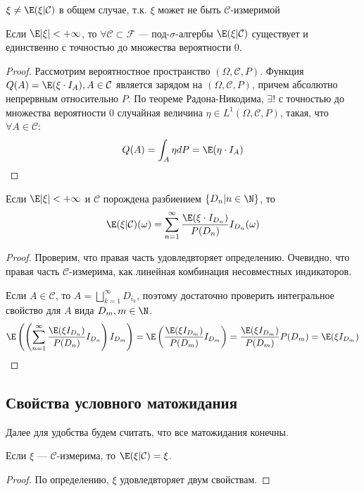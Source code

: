 \begin{note}
    \(\xi \ne \E(\xi|\mathcal{C})\) в общем случае, т.к. \(\xi\) может не быть \(\mathcal{C}\)-измеримой
\end{note}

\begin{theorem}
    Если \(\E|\xi| < +\infty\), то \(\forall \mathcal{C} \subset \mathcal{F}\) --- под-\(\sigma\)-алгербы \(\E(\xi | \mathcal{C})\) существует и единственно с точностью до множества вероятности 0.
\end{theorem}
\begin{proof}
    Рассмотрим вероятностное пространство \((\Omega, \mathcal{C}, P)\). Функция \(Q(A) = \E(\xi \cdot I_A), A \in \mathcal{C}\) является зарядом на \((\Omega, \mathcal{C}, P)\), причем абсолютно непрервным относительно \(P\). По теореме Радона-Никодима, \(\exists !\) с точностью до множества вероятности 0 случайная величина \(\eta \in L^1(\Omega, \mathcal{C}, P)\), такая, что \(\forall A \in \mathcal{C}\):
    \[Q(A) = \int_A\eta dP = \E(\eta \cdot I_A)\]
\end{proof}

\begin{lemma}
    Если \(\E|\xi| < +\infty\) и \(\mathcal{C}\) порождена разбиением \(\{D_n | n \in \N\}\), то
    \[\E(\xi | \mathcal{C})(\omega) = \sum_{n = 1}^\infty \frac{\E(\xi \cdot I_{D_n})}{P(D_n)}I_{D_n}(\omega)\]
\end{lemma}
\begin{proof}
    Проверим, что правая часть удовледвторяет определению. Очевидно, что правая часть \(\mathcal{C}\)-измерима, как линейная комбинация несовместных индикаторов.

    Если \(A \in \mathcal{C}\), то \(A = \bigsqcup_{k = 1}^\infty D_{i_k}\), поэтому достаточно проверить интегральное свойство для \(A\) вида \(D_m, m \in \N\).
    \[\E\left( \left( \sum_{n = 1}^\infty \frac{\E(\xi I_{D_n})}{P(D_n)} I_{D_n}\right) I_{D_m}\right) = \E\left( \frac{\E(\xi I_{D_m})}{P(D_m)} I_{D_m}\right) = \frac{\E(\xi I_{D_m})}{P(D_m)} P(D_m) = \E(\xi I_{D_m})\]
\end{proof}

\subsection{Свойства условного матожидания}
Далее для удобства будем считать, что все матожидания конечны.

\begin{proposition}
    Если \(\xi\) --- \(\mathcal{C}\)-измерима, то \(\E(\xi|\mathcal{C}) = \xi\).
\end{proposition}
\begin{proof}
    По определению, \(\xi\) удовледвторяет двум свойствам.
\end{proof}

